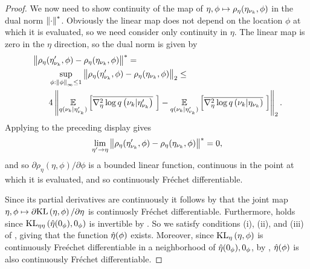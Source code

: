 \begin{thm}
\begin{proof}
We now need to show continuity of the map of $\eta, \phi \mapsto
\rho_\eta(\eta_{\nu_{k}}, \phi)$ in the dual norm $\left\Vert\cdot\right\Vert^*$.  Obviously the
linear map does not depend on the location $\phi$ at which it is evaluated, so
we need consider only continuity in $\eta$.  The linear map is zero in the
$\eta$ direction, so the dual norm is given by
%
\begin{align*}
%
\MoveEqLeft
\norm{\rho_\eta(\etanuk', \phi) - \rho_\eta(\etanuk, \phi)}^* ={}\\&
\sup_{\phi: \norminf{\phi} \le 1}
    \norm{\rho_\eta(\etanuk', \phi) - \rho_\eta(\etanuk, \phi)}_2 \le{}\\&
4 \norm{
    \expect{\q(\nuk \vert \etanuk')}{\lqhessbar{\nuk \vert \etanuk'}} -
    \expect{\q(\nuk \vert \etanuk')}{\lqhessbar{\nuk \vert \etanuk}}
}_2.
%
\end{align*}
%
Applying  to the preceding display gives
%
\begin{align*}
%
\lim_{\eta' \rightarrow \eta}
    \norm{\rho_\eta(\etanuk', \phi) - \rho_\eta(\etanuk, \phi)}^* = 0,
%
\end{align*}
%
and so $\partial \rho_\eta(\eta, \phi) / \partial \phi$ is a bounded linear
function, continuous in the point at which it is evaluated, and so continuously
Fr{\'e}chet differentiable.

Since its partial derivatives are continuously it follows by \citet[Proposition
4.14(c)]{zeidler:2013:functional} that the joint map $\eta, \phi \mapsto
\partial \mathrm{KL}\left(\eta, \phi\right) / \partial \eta$ is continuosly Fr{\'e}chet
differentiable.  Furthermore, \citet[Chapter 4 Condition
21b]{zeidler:2013:functional} holds since $\mathrm{KL}_{\eta\eta}\left(\hat\eta(0_\phi), 0_\phi\right)$ is
invertible by .   So we satisfy conditions (i),
(ii), and (iii) of \citet[Theorem 4.B(c)]{zeidler:2013:functional}, giving that
the function $\hat\eta(\phi)$ exists.  Moreover, since $\mathrm{KL}_{\eta}\left(\eta, \phi\right)$ is
continuously Fre{\'e}chet differentiable in a neighborhood of $\hat\eta(0_\phi),
0_\phi$, by \citet[Theorem 4.B(d)]{zeidler:2013:functional}, $\hat\eta(\phi)$ is
also continuously Fr{\'e}chet differentiable.


%
\end{proof}
%
\end{thm}
%
